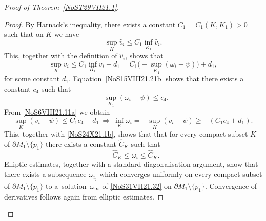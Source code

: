 \documentclass[pdftex]{sigma}
\numberwithin{equation}{section}
\newcommand{\red}[1]{{\color{red}#1}}
\newcommand{\mv}{\omega}%
\renewcommand{\red}[1]{#1}
\begin{document}
\begin{proof}[Proof of Theorem~\ref{NoST29VII21.1}]
\begin{proof}
By Harnack's inequality, there exists a constant $C_1= C_1(K,K_1) >0$ such that on $K$ we have
\begin{equation*}%
 \sup_K \red{\hat v_i} \le C_1 \inf_{K_1} \red{\hat v_i}.
\end{equation*}
This, together with the definition of $\red{\hat v_i}$, shows that
\begin{equation}\label{NoS6VIII21.11a}
 \sup_K \red{v_i} \le C_1 \inf_{K_1} \red{v_i} +d_1 =
 C_1 \big({-}\sup_{K_1}( {\mv_i}-\psi) \big) +d_1,
\end{equation}
for some constant $d_1$.
Equation~\eqref{NoS15VIII21.21b} shows that there exists a constant $c_4$ such that
\begin{equation*}%
- \sup_{K_1} (\mv_i -\psi)
 \le c_4.
\end{equation*}
From \eqref{NoS6VIII21.11a} we obtain
\begin{equation*}%
 \sup_K (\red{v_{i }}- \psi) \le C_1 c_4 +d_1
 \
 \Longrightarrow
 \
 \inf_K \red{\mv_{i }} = - \sup_K (\red{v_{i }}- \psi) \ge -(C_1 c_4 +d_1).
\end{equation*}
This, together with \eqref{NoS24X21.1b}, shows that
that for every compact subset $K$ of $\partial M_1\setminus \{p_1\}$
there exists a constant $\hat C_K$ such that
\begin{equation*}%
 - \hat C_K \le \red{\mv_{i }} \le \hat C_K.
\end{equation*}
Elliptic estimates, together with a standard diagonalisation argument, show that there exists a subsequence $\mv_{i_{j }}$ which
converges uniformly on every compact subset of $\partial M_1 \setminus \{p_1\}$ to a~solution~$\mv_\infty $
of \eqref{NoS31VII21.32} on $\partial M_1 \setminus \{p_1\}$. Convergence of derivatives follows again from elliptic estimates.
\end{proof}


\end{proof}
\end{document}
